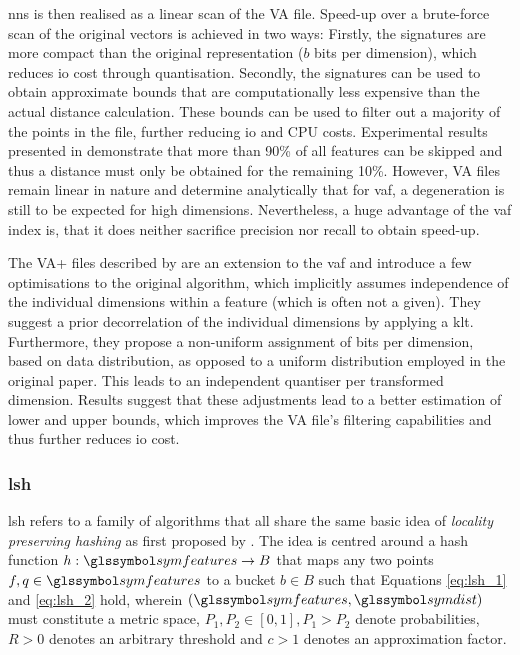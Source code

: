 \acrshort{nns} is then realised as a linear scan of the VA file. Speed-up over a brute-force scan of the original vectors is achieved in two ways: Firstly, the signatures are more compact than the original representation ($b$ bits per dimension), which reduces \acrshort{io} cost through quantisation. Secondly, the signatures can be used to obtain approximate bounds that are computationally less expensive than the actual distance calculation. These bounds can be used to filter out a majority of the points in the file, further reducing \acrshort{io} and CPU costs. Experimental results presented in \cite{Weber:1998Va} demonstrate that more than 90\% of all features can be skipped and thus a distance must only be obtained for the remaining 10\%. However, VA files remain linear in nature and \cite{Echihabi:2021High} determine analytically that for \acrshort{vaf}, a degeneration is still to be expected for high dimensions. Nevertheless, a huge advantage of the \acrshort{vaf} index is, that it does neither sacrifice precision nor recall to obtain speed-up.

The VA+ files described by \cite{Ferhatosmanoglu:2000Vector} are an extension to the \acrshort{vaf} and introduce a few optimisations to the original algorithm, which implicitly assumes independence of the individual dimensions within a feature (which is often not a given). They suggest a prior decorrelation of the individual dimensions by applying a \acrfull{klt}. Furthermore, they propose a non-uniform assignment of bits per dimension, based on data distribution, as opposed to a uniform distribution employed in the original paper. This leads to an independent quantiser per transformed dimension. Results suggest that these adjustments lead to a better estimation of lower and upper bounds, which improves the VA file's filtering capabilities and thus further reduces \acrshort{io} cost.

\subsubsection{\texorpdfstring{\acrfull{lsh}}{Locality Sensitive Hashing (LSH)}}

\acrshort{lsh} refers to a family of algorithms \cite{Echihabi:2021High,Wang:2017ASurvey} that all share the same basic idea of \emph{locality preserving hashing} as first proposed by \cite{Indyk1998:Approximate}. The idea is centred around a hash function $h: \symfeatures \rightarrow B$ that maps any two points $f,q \in \symfeatures$ to a bucket $b \in B$ such that Equations \ref{eq:lsh_1} and \ref{eq:lsh_2} hold, wherein $(\symfeatures, \symdist)$ must constitute a metric space, $P_1, P_2 \in [0, 1], P_1 > P_2$ denote probabilities, $R > 0$ denotes an arbitrary threshold and $c > 1$ denotes an approximation factor.

